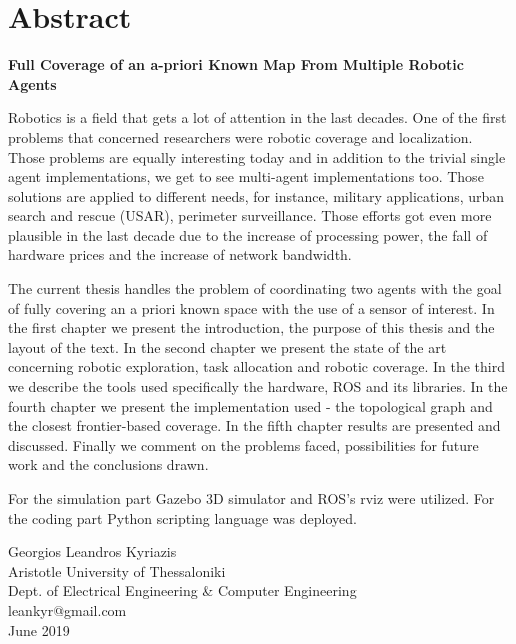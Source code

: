 \section*{Abstract}

\begin{minipage}{1\textwidth}
\centering
\LARGE{\textbf{Full Coverage of an a-priori Known Map From Multiple Robotic Agents}}
\end{minipage}

\vspace{1 cm}

Robotics is a field that gets a lot of attention in the last decades. One of the first problems that concerned researchers were robotic coverage and localization. Those problems are equally interesting today and in addition to the trivial single agent implementations, we get to see multi-agent implementations too. Those solutions are applied to different needs, for instance, military applications, urban search and rescue (USAR), perimeter surveillance. Those efforts got even more plausible in the last decade due to the increase of processing power, the fall of hardware prices and the increase of network bandwidth.

The current thesis handles the problem of coordinating two agents with the goal of fully covering an a priori known space with the use of a sensor of interest. In the first chapter we present the introduction, the purpose of this thesis and the layout of the text. In the second chapter we present the state of the art concerning robotic exploration, task allocation and robotic coverage. In the third we describe the tools used specifically the hardware, ROS and its libraries. In the fourth chapter we present the implementation used - the topological graph and the closest frontier-based coverage.  In the fifth chapter results are presented and discussed. Finally we comment on the problems faced, possibilities for future work and the conclusions drawn.

For the simulation part Gazebo 3D simulator and ROS's rviz were utilized. For the coding part Python scripting language was deployed. 

\begin{flushright}
Georgios Leandros Kyriazis \\
Aristotle University of Thessaloniki \\
Dept. of Electrical Engineering \& Computer Engineering \\
leankyr@gmail.com \\
June 2019	
\end{flushright} 
 